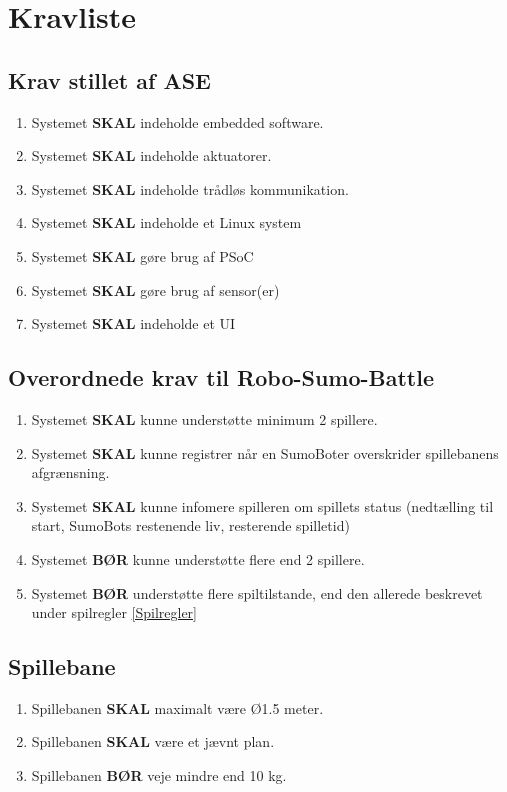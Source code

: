 \section{Kravliste} \label{Kravliste}

\subsection{Krav stillet af ASE}
\begin{enumerate}
    \item Systemet \textbf{SKAL} indeholde embedded software.
    \item Systemet \textbf{SKAL} indeholde aktuatorer.
    \item Systemet \textbf{SKAL} indeholde trådløs kommunikation.
    \item Systemet \textbf{SKAL} indeholde et Linux system
    \item Systemet \textbf{SKAL} gøre brug af PSoC
    \item Systemet \textbf{SKAL} gøre brug af sensor(er)
    \item Systemet \textbf{SKAL} indeholde et UI
\end{enumerate}

\subsection{Overordnede krav til Robo-Sumo-Battle}
\begin{enumerate}
    \item Systemet \textbf{SKAL} kunne understøtte minimum 2 spillere.
    \item Systemet \textbf{SKAL} kunne registrer når en SumoBoter overskrider spillebanens afgrænsning.
    \item Systemet \textbf{SKAL} kunne infomere spilleren om spillets status (nedtælling til start, SumoBots restenende liv, resterende spilletid)
    \item Systemet \textbf{BØR} kunne understøtte flere end 2 spillere.  
    \item Systemet \textbf{BØR} understøtte flere spiltilstande, end den allerede beskrevet under spilregler \ref{Spilregler}
\end{enumerate}

\subsection{Spillebane}
\begin{enumerate}
    \item Spillebanen \textbf{SKAL} maximalt være Ø1.5 meter.
    \item Spillebanen \textbf{SKAL} være et jævnt plan.
    \item Spillebanen \textbf{BØR} veje mindre end 10 kg.
\end{enumerate}


